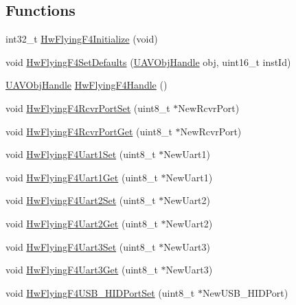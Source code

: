 \subsection*{\-Functions}
\begin{DoxyCompactItemize}
\item 
int32\-\_\-t \hyperlink{group___hw_flying_f4_gad86531663ba1d76e33600a1f3a830c23}{\-Hw\-Flying\-F4\-Initialize} (void)
\item 
void \hyperlink{group___hw_flying_f4_gac9bdeff03bf6557eef922242e8153547}{\-Hw\-Flying\-F4\-Set\-Defaults} (\hyperlink{targets_2_u_a_v_objects_2inc_2uavobjectmanager_8h_a279053e22be53ce9f895043aaeb91e3b}{\-U\-A\-V\-Obj\-Handle} obj, uint16\-\_\-t inst\-Id)
\item 
\hyperlink{targets_2_u_a_v_objects_2inc_2uavobjectmanager_8h_a279053e22be53ce9f895043aaeb91e3b}{\-U\-A\-V\-Obj\-Handle} \hyperlink{group___hw_flying_f4_gae82ff4a74347d8ec3338d28823bc22a9}{\-Hw\-Flying\-F4\-Handle} ()
\item 
void \hyperlink{group___hw_flying_f4_ga6301891a7b3d5b81bd8d6aab53d85af2}{\-Hw\-Flying\-F4\-Rcvr\-Port\-Set} (uint8\-\_\-t $\ast$\-New\-Rcvr\-Port)
\item 
void \hyperlink{group___hw_flying_f4_ga534c8f794baa96fa5f29771a681e90c4}{\-Hw\-Flying\-F4\-Rcvr\-Port\-Get} (uint8\-\_\-t $\ast$\-New\-Rcvr\-Port)
\item 
void \hyperlink{group___hw_flying_f4_ga9048dffdfce36106ed9b23d2667d244f}{\-Hw\-Flying\-F4\-Uart1\-Set} (uint8\-\_\-t $\ast$\-New\-Uart1)
\item 
void \hyperlink{group___hw_flying_f4_ga55a01cb7ff1be647200c57c30ed29421}{\-Hw\-Flying\-F4\-Uart1\-Get} (uint8\-\_\-t $\ast$\-New\-Uart1)
\item 
void \hyperlink{group___hw_flying_f4_ga1d1ad6077a34ca92d32e22785fd89206}{\-Hw\-Flying\-F4\-Uart2\-Set} (uint8\-\_\-t $\ast$\-New\-Uart2)
\item 
void \hyperlink{group___hw_flying_f4_ga60a57bf55872c8b61615402ff4adbc64}{\-Hw\-Flying\-F4\-Uart2\-Get} (uint8\-\_\-t $\ast$\-New\-Uart2)
\item 
void \hyperlink{group___hw_flying_f4_gadf9752227f95fd63a2fe1848262dfccd}{\-Hw\-Flying\-F4\-Uart3\-Set} (uint8\-\_\-t $\ast$\-New\-Uart3)
\item 
void \hyperlink{group___hw_flying_f4_ga0b1ab1df6d2bc41d58b50992c2e1c17a}{\-Hw\-Flying\-F4\-Uart3\-Get} (uint8\-\_\-t $\ast$\-New\-Uart3)
\item 
void \hyperlink{group___hw_flying_f4_ga63162bd1f17a302fcbe08587b31384b1}{\-Hw\-Flying\-F4\-U\-S\-B\-\_\-\-H\-I\-D\-Port\-Set} (uint8\-\_\-t $\ast$\-New\-U\-S\-B\-\_\-\-H\-I\-D\-Port)

\end{DoxyCompactItemize}

